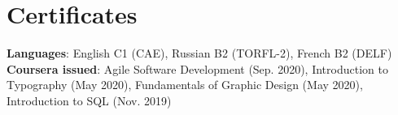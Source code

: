 \documentclass[letterpaper,10.5pt]{article}
\begin{document}
 \section{Certificates}
 \begin{itemize}[leftmargin=0.15in, label={}]
    \small{\item{
     \textbf{Languages}{: English C1 (CAE), Russian B2 (TORFL-2), French B2 (DELF)} \\
     \textbf{Coursera issued}{: Agile Software Development (Sep. 2020), Introduction to Typography (May 2020), Fundamentals of Graphic Design (May 2020), Introduction to SQL (Nov. 2019)} \\
    }}
 \end{itemize}



\end{document}
